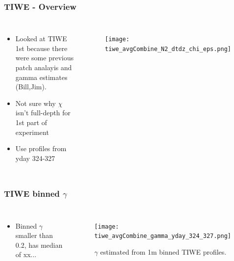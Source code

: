 \documentclass{beamer}
\begin{document}
\begin{frame}
 \frametitle{TIWE - Overview}

\begin{columns}
\begin{itemize}
\item Looked at TIWE 1st because there were some previous patch analayis and gamma estimates (Bill,Jim).
\item Not sure why $\chi$ isn't full-depth for 1st part of experiment
\item Use profiles from yday 324-327
\end{itemize}

\begin{figure}[htbp]
\begin{center}
\texttt{[image: tiwe\_avgCombine\_N2\_dtdz\_chi\_eps.png]}
\caption{}
\label{default}
\end{center}
\end{figure}

\end{columns}


\end{frame}


\begin{frame}
 \frametitle{TIWE binned $\gamma$}

\begin{columns}
\begin{itemize}
\item Binned $\gamma$ smaller than 0.2, has median of xx...
\end{itemize}

\begin{figure}[htbp]
\begin{center}
\texttt{[image: tiwe\_avgCombine\_gamma\_yday\_324\_327.png]}
\caption{$\gamma$ estimated from 1m binned TIWE profiles.}
\label{default}
\end{center}
\end{figure}

\end{columns}


\end{frame}
\end{document}
